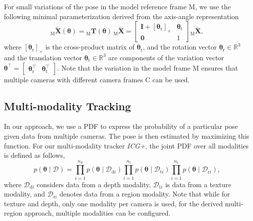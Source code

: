 \documentclass[letterpaper, 10 pt, conference]{ieeeconf}
\begin{document}
For small variations of the pose in the model reference frame $\textrm{M}$, we use the following minimal parameterization derived from the axis-angle representation
\begin{equation}\label{eq:c04}
	_\textrm{M}\pmb{\widetilde{X}}(\pmb{\theta}) =
	{}_\textrm{M}\pmb{T}(\pmb{\theta})\,{}_\textrm{M}\pmb{\widetilde{X}} =
	\begin{bmatrix}
		\pmb{I} + [\pmb{\theta}_\textrm{r}]_\times & \pmb{\theta}_\textrm{t} \\ \pmb{0} & 1
	\end{bmatrix}
	{}_\textrm{M}\pmb{\widetilde{X}},
\end{equation}
where $[\pmb{\theta}_\textrm{r}]_\times$ is the cross-product matrix of $\pmb{\theta}_\textrm{r}$, and the rotation vector $\pmb{\theta}_\textrm{r}\in \mathbb{R}^3$ and the translation vector $\pmb{\theta}_\textrm{t}\in \mathbb{R}^3$ are components of the variation vector $\pmb{\theta}^\top = \begin{bmatrix} \pmb{\theta}_\textrm{r}^\top & \pmb{\theta}_\textrm{t}^\top \end{bmatrix}$.
Note that the variation in the model frame $\textrm{M}$ ensures that multiple cameras with different camera frames $\textrm{C}$ can be used.



\subsection{Multi-modality Tracking}\label{sec:c1}
In our approach, we use a \ac{PDF} to express the probability of a particular pose given data from multiple cameras.
The pose is then estimated by maximizing this function.
For our multi-modality tracker \textit{ICG+}, the joint \ac{PDF} over all modalities is defined as follows,
\begin{equation}\label{eq:c10}
	p(\pmb{\theta} \mid \pmb{\mathcal{D}}) = \prod_{i=1}^{n_\textrm{d}} p(\pmb{\theta} \mid \pmb{\mathcal{D}}_{\textrm{d}i}) \prod_{i=1}^{n_\textrm{t}} p(\pmb{\theta} \mid \pmb{\mathcal{D}}_{\textrm{t}i}) \prod_{i=1}^{n_\textrm{r}} p(\pmb{\theta} \mid \pmb{\mathcal{D}}_{\textrm{r}i}),
\end{equation}
where $\pmb{\mathcal{D}}_{\textrm{d}i}$ considers data from a depth modality, $\pmb{\mathcal{D}}_{\textrm{t}i}$ is data from a texture modality, and $\pmb{\mathcal{D}}_{\textrm{r}i}$ denotes data from a region modality.
Note that while for texture and depth, only one modality per camera is used, for the derived multi-region approach, multiple modalities can be configured.
\end{document}
